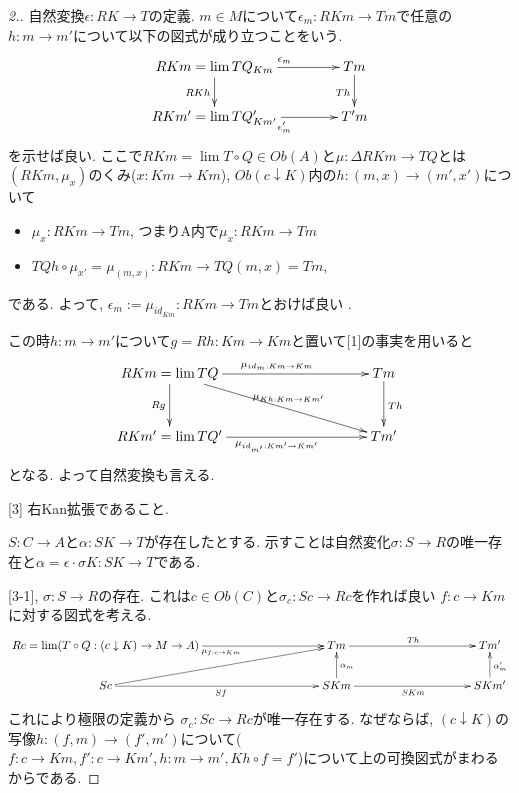 \documentclass[dvipdfmx,a4paper,11pt]{report}
\theoremstyle{definition}
\begin{document}
\begin{proof}
[2.] 自然変換$\epsilon : RK \to T$の定義. 
$m \in M$について$\epsilon_m : RKm\to T m$で任意の$ h : m \to m'$について以下の図式が成り立つことをいう.  
\begin{equation*}
\xymatrix@C=40pt@R=20pt{
RKm = \lim T Q_{Km}  \ar@{->}[d]_{RK h}  \ar@{->}[r]^{\epsilon_m} & Tm\ar@{->}[d]_{Th} \\
RKm'= \lim TQ'_{Km'} \ar@{->}[r]_{\epsilon_m'} &T'm \\   
}
\end{equation*}
を示せば良い.
ここで$RKm =\lim T\circ Q \in Ob(A)$と$\mu: \Delta RKm \to TQ$とは
$(RKm , \mu_{x})$のくみ($x : Km \to Km $), $Ob(c \downarrow K )$内の$h : (m,x)\to (m',x')$について
\begin{itemize}
\item $\mu_{x} : RKm \to Tm  $, つまりA内で$\mu_{x} :  RKm\to Tm $
\item $ TQ h  \circ \mu_{x'} = \mu_{(m,x)} :RKm \to  TQ(m,x) =Tm$, 
\end{itemize}
である. 
よって, $\epsilon_{m} := \mu_{ id_{Km}} : RKm \to Tm$とおけば良い .

この時$h : m \to m'$について$g=Rh : Km \to Km$と置いて[1]の事実を用いると
\begin{equation*}
\xymatrix@C=100pt@R=30pt{
RKm = \lim TQ  \ar@{->}[d]_{Rg}  \ar@{->}[r]^{\mu_{ id_{m} : Km\to Km} }
\ar@{->}[rd]^{\mu_{Kh:  Km \to Km'}}
& Tm\ar@{->}[d]^{Th} \\
RKm' = \lim TQ' \ar@{->}[r]_{\mu_{ id_{m'} : Km' \to Km'}} &Tm' \\   
}
\end{equation*}
となる. 
よって自然変換も言える. 

[3] 右Kan拡張であること. 

$S : C \to A$と$\alpha : SK \to T$が存在したとする. 
示すことは自然変化$ \sigma : S \to R$の唯一存在と$\alpha = \epsilon \cdot \sigma K : SK \to T$である. 

[3-1], $\sigma : S \to R$の存在.
これは$c \in Ob(C)$と$\sigma_c : Sc \to Rc$を作れば良い
$f : c \to Km$に対する図式を考える.
\begin{equation*}
\xymatrix@C=100pt@R=20pt{
Rc = \lim (T \circ Q : (c \downarrow K) \to M \to A) \ar@{->}[r]_{\mu_{f : c \to Km}}  
& Tm \ar@{->}[r]^{Th}
&Tm'  \\
Sc\ar@{->}[r]_{Sf}  \ar@{->}[ru]
& SKm \ar@{->}[r]_{SKm} \ar@{->}[u]_{\alpha_m} 
&SKm' \ar@{->}[u]_{\alpha_m'} \\   
}
\end{equation*}
これにより極限の定義から
$\sigma_c : Sc \to Rc$が唯一存在する.
なぜならば, $(c \downarrow K)$の写像$ h : (f, m) \to (f', m')$について($f: c \to Km, f' : c \to Km', h: m \to m', Kh \circ f =f'$)について上の可換図式がまわるからである. 


\end{proof}
\end{document}
